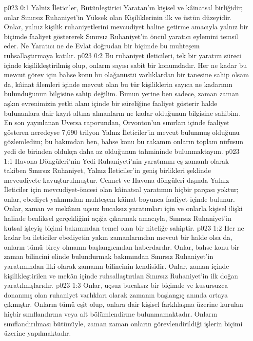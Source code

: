 \vs p023 0:1 Yalniz İleticiler, Bütünleştirici Yaratan’ın kişisel ve kâinatsal birliğidir; onlar Sınırsız Ruhaniyet’in Yüksek olan Kişiliklerinin ilk ve üstün düzeyidir. Onlar, yalnız kişilik ruhaniyetlerini mevcudiyet haline getirme amacıyla yalnız bir biçimde faaliyet göstererek Sınırsız Ruhaniyet’in öncül yaratıcı eylemini temsil eder. Ne Yaratıcı ne de Evlat doğrudan bir biçimde bu muhteşem ruhsallaştırmaya katılır.
\vs p023 0:2 Bu ruhaniyet ileticileri, tek bir yaratım süreci içinde kişilikleştirilmiş olup, onların sayısı sabit bir konumdadır. Her ne kadar bu mevcut görev için bahse konu bu olağanüstü varlıklardan bir tanesine sahip olsam da, kâinat âlemleri içinde mevcut olan bu tür kişiliklerin sayıca ne kadarının bulunduğunun bilgisine sahip değilim. Bunun yerine ben sadece, zaman zaman aşkın evrenimizin yetki alanı içinde bir süreliğine faaliyet gösterir halde bulunanlara dair kayıt altına alınanların ne kadar olduğunun bilgisine sahibim. En son yayınlanan Uversa raporundan, Orvonton’un sınırları içinde faaliyet gösteren neredeyse 7,690 trilyon Yalnız İleticiler’in mevcut bulunmuş olduğunu gözlemledim; bu bakımdan ben, bahse konu bu rakamın onların toplam nüfusun yedi de birinden oldukça daha az olduğunun tahmininde bulunmaktayım.
\vs p023 1:1 Havona Döngüleri’nin Yedi Ruhaniyeti’nin yaratımını eş zamanlı olarak takiben Sınırsız Ruhaniyet, Yalnız İleticiler’in geniş birlikleri şeklinde mevcudiyete kavuşturulmuştur. Cennet ve Havona döngüleri dışında Yalnız İleticiler için mevcudiyet\hyp{}öncesi olan kâinatsal yaratımın hiçbir parçası yoktur; onlar, ebediyet yakınından muhteşem kâinat boyunca faaliyet içinde bulunur. Onlar, zaman ve mekânın uçsuz bucaksız yaratımları için ve onlarla kişisel ilişki halinde benliksel gerçekliğini açığa çıkarmak amacıyla, Sınırsız Ruhaniyet’in kutsal işleyiş biçimi bakımından temel olan bir niteliğe sahiptir.
\vs p023 1:2 Her ne kadar bu ileticiler ebediyetin yakın zamanlarından mevcut bir halde olsa da, onların tümü birey olmanın başlangıcından haberdardır. Onlar, bahse konu bir zaman bilincini elinde bulundurmak bakımından Sınırsız Ruhaniyet’in yaratımından ilki olarak zamanın bilincinin kendisidir. Onlar, zaman içinde kişilikleştirilen ve mekân içinde ruhsallaştırılan Sınırsız Ruhaniyet’in ilk doğan yaratılmışlarıdır.
\vs p023 1:3 Onlar, uçsuz bucaksız bir biçimde ve kusursuzca donanmış olan ruhaniyet varlıkları olarak zamanın başlangıç anında ortaya çıkmıştır. Onların tümü eşit olup, onlara dair kişisel farklılaşma üzerine kurulan hiçbir sınıflandırma veya alt bölümlendirme bulunmamaktadır. Onların sınıflandırılması bütünüyle, zaman zaman onların görevlendirildiği işlerin biçimi üzerine yapılmaktadır.

